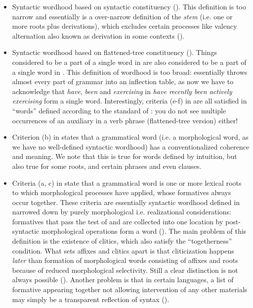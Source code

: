 \documentclass[a4paper, oneside, scheme=plain, 12pt]{article}
\newcommand*{\citepage}[1]{p.~{#1}}
\newcommand*{\citepages}[1]{pp.~{#1}}
\newcommand*{\term}[1]{\emph{#1}}
\newcommand{\form}[1]{\emph{#1}}
\begin{document}
\begin{itemize}
    \item Syntactic wordhood based on syntactic constituency ().
    This definition is too narrow and essentially is a over-narrow definition of the \term{stem}
    (i.e. one or more roots plus derivations),
    which excludes certain processes like valency alternation also known as derivation in some contexts
    ().

    \item Syntactic wordhood based on flattened-tree constituency ().
    Things considered to be a part of a single word in 
    are also considered to be a part of a single word in .
    This definition of wordhood is too broad:
    essentially throws almost every part of grammar into an inflection table,
    as now we have to acknowledge that \form{have}, \form{been} and \form{exercising} in \form{have recently been actively exercising} form a single word.
    Interestingly, criteria (e-f) in \citet[\citepages{15-16}]{dixon2010basic2} are all satisfied in ``words'' defined according to the standard of :
    you do not see multiple occurrences of an auxiliary in a verb phrase (flattened-tree version) either!

    \item Criterion (b) in \citet[\citepage{13}]{dixon2010basic2} states that a grammatical word  (i.e. a morphological word, as we have no well-defined syntactic wordhood)
    has a conventionalized coherence and meaning.
    We note that this is true for words defined by intuition,
    but also true for some roots, and certain phrases and even clauses.

    \item Criteria (a, c) in \citet[\citepages{13-16}]{dixon2010basic2} state that 
    a grammatical word is one or more lexical roots to which morphological processes have applied,
    whose formatives always occur together.
    These criteria are essentially syntactic wordhood defined in 
    narrowed down by purely morphological i.e. realizational considerations:
    formatives that pass the test of  
    and are collected into one location by post-syntactic morphological operations
    form a word ().
    The main problem of this definition is the existence of clitics,
    which also satisfy the ``togetherness'' condition.
    What sets affixes and clitics apart is that cliticization happens \emph{later} than formation of morphological words consisting of affixes and roots
    because of reduced morphological selectivity.
    Still a clear distinction is not always possible ().
    Another problem is that in certain languages,
    a list of formative appearing together not allowing intervention of any other materials
    may simply be a transparent reflection of syntax ().
    

\end{itemize}
\end{document}
